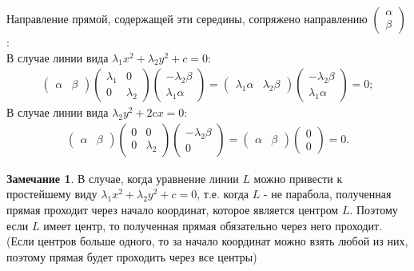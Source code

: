 \documentclass[a4paper, 12pt]{article}
\theoremstyle{definition}
\newtheorem*{remark}{Замечание}
\begin{document}
		Направление прямой, содержащей эти середины, сопряжено направлению $\begin{pmatrix} \alpha \\ \beta \end{pmatrix}$:\\
		В случае линии вида $\lambda_1x^2 + \lambda_2y^2 + c = 0:$
		\begin{align*}
			\begin{pmatrix} \alpha & \beta \end{pmatrix}\begin{pmatrix}\lambda_1&0\\0&\lambda_2\end{pmatrix}\begin{pmatrix} -\lambda_2\beta \\ \lambda_1\alpha \end{pmatrix} = \begin{pmatrix} \lambda_1\alpha & \lambda_2\beta \end{pmatrix}\begin{pmatrix} -\lambda_2\beta \\ \lambda_1\alpha \end{pmatrix} = 0;
		\end{align*}
		В случае линии вида $\lambda_2y^2 + 2cx = 0:$
		\begin{align*}
			\begin{pmatrix} \alpha & \beta \end{pmatrix}\begin{pmatrix}0&0\\0&\lambda_2\end{pmatrix}\begin{pmatrix} -\lambda_2\beta \\ 0 \end{pmatrix} = \begin{pmatrix} \alpha & \beta \end{pmatrix}\begin{pmatrix} 0 \\ 0 \end{pmatrix} = 0.
		\end{align*}  
	\begin{remark}
		В случае, когда уравнение линии $L$ можно привести к простейшему виду $\lambda_1x^2 + \lambda_2y^2 + c = 0$, т.е. когда $L$ - не парабола, полученная прямая проходит через начало координат, которое является центром $L$. Поэтому если $L$ имеет центр, то полученная прямая обязательно через него проходит.\\
		(Если центров больше одного, то за начало координат можно взять любой из них, поэтому прямая будет проходить через все центры)
	\end{remark}
\end{document}
